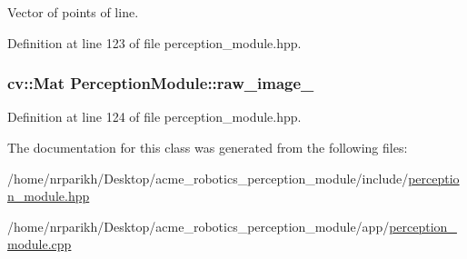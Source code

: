 Vector of points of line. 



Definition at line 123 of file perception\+\_\+module.\+hpp.

\subsubsection[{\texorpdfstring{raw\+\_\+image\+\_\+}{raw_image_}}]{\setlength{\rightskip}{0pt plus 5cm}cv\+::\+Mat Perception\+Module\+::raw\+\_\+image\+\_\+\hspace{0.3cm}{\ttfamily [private]}}\hypertarget{class_perception_module_a66e4d7a55a1ee7eaf0b91cde0c4c5e99}{}\label{class_perception_module_a66e4d7a55a1ee7eaf0b91cde0c4c5e99}


Definition at line 124 of file perception\+\_\+module.\+hpp.



The documentation for this class was generated from the following files\+:\begin{DoxyCompactItemize}
\item 
/home/nrparikh/\+Desktop/acme\+\_\+robotics\+\_\+perception\+\_\+module/include/\hyperlink{perception__module_8hpp}{perception\+\_\+module.\+hpp}\item 
/home/nrparikh/\+Desktop/acme\+\_\+robotics\+\_\+perception\+\_\+module/app/\hyperlink{perception__module_8cpp}{perception\+\_\+module.\+cpp}\end{DoxyCompactItemize}
